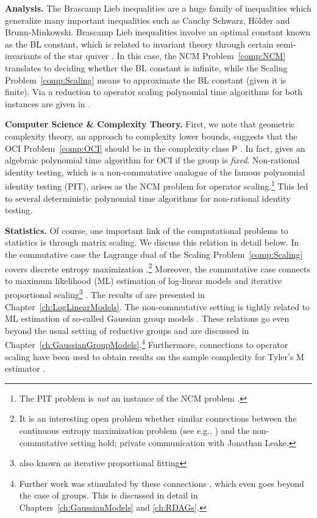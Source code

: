 \textbf{Analysis.}
The Brascamp Lieb inequalities \cite{brascamp1976best, lieb1990gaussian} are a huge family of inequalities which generalize many important inequalities such as Cauchy Schwarz, Hölder and Brunn-Minkowski. Brascamp Lieb inequalities involve an optimal constant known as the BL constant, which is related to invariant theory through certain semi-invariants of the star quiver \cite[Section~4.1]{garg2018BrascampLieb}. In this case, the NCM Problem~\ref{comp:NCM} translates to deciding whether the BL constant is infinite, while the Scaling Problem~\ref{comp:Scaling} means to approximate the BL constant (given it is finite).
Via a reduction to operator scaling polynomial time algorithms for both instances are given in \cite{garg2018BrascampLieb}.

\textbf{Computer Science \& Complexity Theory.}
First, we note that geometric complexity theory, an approach to complexity lower bounds, suggests that the OCI Problem~\ref{comp:OCI} should be in the complexity class $\mathsf{P}$ \cite{mulmuley2017geometric}. In fact, \cite{mulmuley2017geometric} gives an algebraic polynomial time algorithm for OCI if the group is \emph{fixed}.
Non-rational identity testing, which is a non-commutative analogue of the famous polynomial identity testing (PIT),  arises as the NCM problem for operator scaling.\footnote{The PIT problem is \emph{not} an instance of the NCM problem \cite{makam2021NotAnullcone}.}
This led to several deterministic polynomial time algorithms \cite{garg2016deterministic, derksen2017polynomial, ivanyos2017constructive, allen2018operator} for non-rational identity testing.

\textbf{Statistics.}
Of course, one important link of the computational problems to statistics is through matrix scaling. We discuss this relation in detail below. In the commutative case the Lagrange dual of the Scaling Problem~\ref{comp:Scaling} covers discrete entropy maximization \cite{singh2014entropy, straszak2019computing}.\footnote{It is an interesting open problem whether similar connections between the continuous entropy maximization problem (see e.g., \cite{leake2020ContEntropySTOC}) and the non-commutative setting hold; private communication with Jonathan Leake.} %
Moreover, the commutative case connects to maximum likelihood (ML) estimation of log-linear models and iterative proportional scaling\footnote{also known as iterative proportional fitting}
\cite{DiscretePaper}. The results of \cite{DiscretePaper} are presented in Chapter~\ref{ch:LogLinearModels}.
The non-commutative setting is tightly related to ML estimation of so-called Gaussian group models \cite{SiagaPaper}. These relations go even beyond the usual setting of reductive groups and are discussed in Chapter~\ref{ch:GaussianGroupModels}.\footnote{Further work was stimulated by these connections \cite{RDAG}, which even goes beyond the case of groups. This is discussed in detail in Chapters~\ref{ch:GaussianModels} and \ref{ch:RDAGs}.}
Furthermore, connections to operator scaling have been used to obtain results on the sample complexity for Tyler's M estimator \cite{franks2020rigorous}. 

